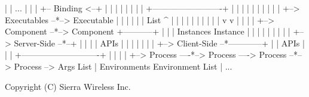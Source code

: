 \begin{DoxyVerb}
    |                          |       ...                  |  |     |   +-- Binding <--+  |
    |                          |                            |  |     |                     |
    |                          +-------------------------+  |  |     |                     |
    |                                                    |  |  |     |                     |
    +--> Executables --*--> Executable                   |  |  |     |                     |
    |    List                  ^  |                      |  |  |     |                     |
    |                          |  |                      |  v  v     |                     |
    |                          |  +--> Component --*--> Component    +-----------+         |
    |                          |       Instances        Instance                 |         |
    |                          |                           |                     |         |
    |                          |                           +--> Server-Side --*--+         |
    |                          |                           |     APIs                      |
    |                          |                           |                               |
    |                          |                           +--> Client-Side --*------------+
    |                          |                                 APIs
    |                          |
    |                          +----------------------------+
    |                                                       |
    |                                                       |
    +--> Process  ----*--> Process  ----> Process --*--> Process --> Args List
    |    Environments      Environment     List
    |
    ...\end{DoxyVerb}
 \begin{DoxyVerb}Copyright (C) Sierra Wireless Inc.\end{DoxyVerb}
 